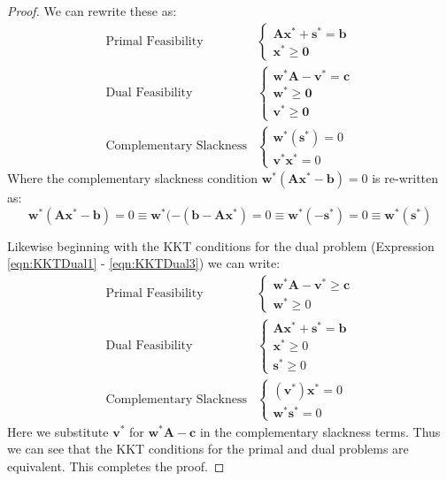 \begin{proof}
We can rewrite these as:
\begin{align}
\text{Primal Feasibility}&\left\{ 
\begin{aligned}
\mathbf{A}\mathbf{x}^* + \mathbf{s}^* = \mathbf{b}\\
\mathbf{x}^* \geq \mathbf{0}
\end{aligned}\right.\\
\text{Dual Feasibility}&\left\{ 
\begin{aligned}
\mathbf{w}^*\mathbf{A} - \mathbf{v}^* = \mathbf{c}\\
\mathbf{w}^* \geq \mathbf{0}\\
\mathbf{v}^* \geq \mathbf{0}
\end{aligned}\right.\\
\text{Complementary Slackness}&\left\{ 
\begin{aligned}
\mathbf{w}^*\left(\mathbf{s}^*\right) = 0\\
\mathbf{v}^*\mathbf{x}^* = 0
\end{aligned}\right.
\end{align}
Where the complementary slackness condition $\mathbf{w}^*(\mathbf{A}\mathbf{x}^* - \mathbf{b}) = 0$ is re-written as:
\begin{displaymath}
\mathbf{w}^*(\mathbf{A}\mathbf{x}^* - \mathbf{b}) = 0 \equiv \mathbf{w}^*(-(\mathbf{b} - \mathbf{A}\mathbf{x}^*) = 0 \equiv \mathbf{w}^*(-\mathbf{s}^*) = 0 \equiv \mathbf{w}^*(\mathbf{s}^*) 
\end{displaymath}

Likewise beginning with the KKT conditions for the dual problem (Expression \ref{eqn:KKTDual1} - \ref{eqn:KKTDual3}) we can write:
\begin{align*}
\text{Primal Feasibility}&\left\{ 
\begin{aligned}
\mathbf{w}^*\mathbf{A} - \mathbf{v}^* \geq \mathbf{c}\\
\mathbf{w}^* \geq 0
\end{aligned}\right.\\
\text{Dual Feasibility}&\left\{ 
\begin{aligned}
\mathbf{A}\mathbf{x}^* + \mathbf{s}^* = \mathbf{b}\\
\mathbf{x}^* \geq 0\\
\mathbf{s}^* \geq 0
\end{aligned}\right.\\
\text{Complementary Slackness}&\left\{ 
\begin{aligned}
\left(\mathbf{v}^*\right)\mathbf{x}^* = 0\\
\mathbf{w}^*\mathbf{s}^* = 0
\end{aligned}\right.
\end{align*}
Here we substitute $\mathbf{v}^*$ for $\mathbf{w}^*\mathbf{A} - \mathbf{c}$ in the complementary slackness terms. Thus we can see that the KKT conditions for the primal and dual problems are equivalent. This completes the proof.
\end{proof}
